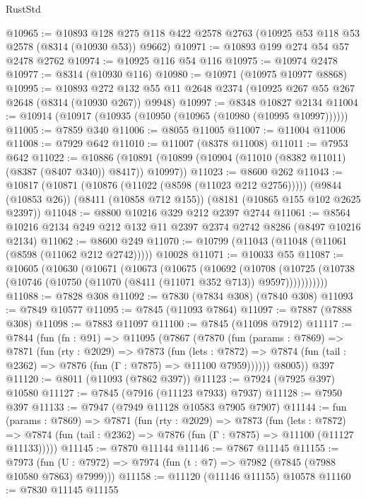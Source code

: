 \begin{lexlean}{RustStd}
\begin{coremodule}
@10965 := @10893
    @128
    @275
    @118
    @422
    @2578
    @2763
    (@10925 @53 @118 @53 @2578 (@8314 (@10930 @53)) @9662)
@10971 := @10893 @199 @274 @54 @57 @2478 @2762
@10974 := @10925 @116 @54 @116
@10975 := @10974 @2478
@10977 := @8314 (@10930 @116)
@10980 := @10971 (@10975 @10977 @8868)
@10995 := @10893
    @272
    @132
    @55
    @11
    @2648
    @2374
    (@10925 @267 @55 @267 @2648 (@8314 (@10930 @267)) @9948)
@10997 := @8348 @10827 @2134
@11004 := @10914 (@10917 (@10935 (@10950 (@10965 (@10980 (@10995 @10997))))))
@11005 := @7859 @340
@11006 := @8055 @11005
@11007 := @11004 @11006
@11008 := @7929 @642
@11010 := @11007 (@8378 @11008)
@11011 := @7953 @642
@11022 := @10886
    (@10891 (@10899 (@10904 (@11010 (@8382 @11011) (@8387 (@8407 @340)) @8417)) @10997))
@11023 := @8600 @262
@11043 := @10817
    (@10871 (@10876 (@11022 (@8598 (@11023 @212 @2756)))))
    (@9844 (@10853 @26))
    (@8411 (@10858 @712 @155))
    (@8181 (@10865 @155 @102 @2625 @2397))
@11048 := @8800 @10216 @329 @212 @2397 @2744
@11061 := @8564 @10216 @2134 @249 @212 @132 @11 @2397 @2374 @2742 @8286 (@8497 @10216 @2134)
@11062 := @8600 @249
@11070 := @10799 (@11043 (@11048 (@11061 (@8598 (@11062 @212 @2742))))) @10028
@11071 := @10033 @55
@11087 := @10605
    (@10630
      (@10671
        (@10673
          (@10675
            (@10692
              (@10708
                (@10725 (@10738 (@10746 (@10750 (@11070 (@8411 (@11071 @352 @713)) @9597)))))))))))
@11088 := @7828 @308
@11092 := @7830 (@7834 @308) (@7840 @308)
@11093 := @7849 @10577
@11095 := @7845 (@11093 @7864)
@11097 := @7887 (@7888 @308)
@11098 := @7883 @11097
@11100 := @7845 (@11098 @7912)
@11117 := @7844
    (fun (fn : @91) =>
    @11095
      (@7867
        (@7870
          (fun (params : @7869) =>
          @7871
            (fun (rty : @2029) =>
            @7873
              (fun (lets : @7872) =>
              @7874 (fun (tail : @2362) => @7876 (fun (Γ : @7875) => @11100 @7959))))))
        @8005))
    @397
@11120 := @8011 (@11093 (@7862 @397))
@11123 := @7924 (@7925 @397) @10580
@11127 := @7845 (@7916 (@11123 @7933) @7937)
@11128 := @7950 @397
@11133 := @7947 (@7949 @11128 @10583 @7905 @7907)
@11144 := fun (params : @7869) =>
  @7871
    (fun (rty : @2029) =>
    @7873
      (fun (lets : @7872) =>
      @7874 (fun (tail : @2362) => @7876 (fun (Γ : @7875) => @11100 (@11127 @11133)))))
@11145 := @7870 @11144
@11146 := @7867 @11145
@11155 := @7973
    (fun (U : @7972) => @7974 (fun (t : @7) => @7982 (@7845 (@7988 @10580 @7863) @7999)))
@11158 := @11120 (@11146 @11155) @10578
@11160 := @7830 @11145 @11155

\end{coremodule}
\end{lexlean}

